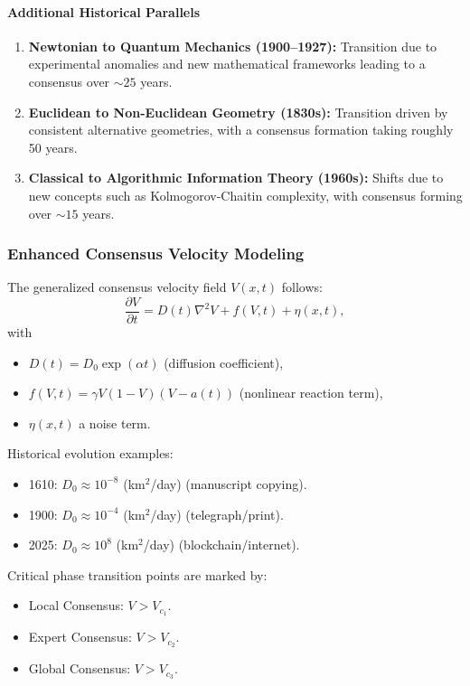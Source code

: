 \documentclass[11pt]{article}
\begin{document}
\paragraph{Additional Historical Parallels}
\begin{enumerate}[label=(\arabic*)]
    \item \textbf{Newtonian to Quantum Mechanics (1900--1927):} Transition due to experimental anomalies and new mathematical frameworks leading to a consensus over $\sim25$ years.
    \item \textbf{Euclidean to Non-Euclidean Geometry (1830s):} Transition driven by consistent alternative geometries, with a consensus formation taking roughly 50 years.
    \item \textbf{Classical to Algorithmic Information Theory (1960s):} Shifts due to new concepts such as Kolmogorov-Chaitin complexity, with consensus forming over $\sim15$ years.
\end{enumerate}

\subsubsection{Enhanced Consensus Velocity Modeling}

The generalized consensus velocity field $V(x,t)$ follows:
\[
\frac{\partial V}{\partial t} = D(t)\nabla^2 V + f(V,t) + \eta(x,t),
\]
with
\begin{itemize}
    \item $D(t)=D_0\exp(\alpha t)$ (diffusion coefficient),
    \item $f(V,t)=\gamma V (1-V)(V-a(t))$ (nonlinear reaction term),
    \item $\eta(x,t)$ a noise term.
\end{itemize}

Historical evolution examples:
\begin{itemize}
    \item 1610: $D_0\approx10^{-8}$ (km$^2$/day) (manuscript copying).
    \item 1900: $D_0\approx10^{-4}$ (km$^2$/day) (telegraph/print).
    \item 2025: $D_0\approx10^{8}$ (km$^2$/day) (blockchain/internet).
\end{itemize}

Critical phase transition points are marked by:
\begin{itemize}
    \item Local Consensus: $V > V_{c_1}$.
    \item Expert Consensus: $V > V_{c_2}$.
    \item Global Consensus: $V > V_{c_3}$.
\end{itemize}
\end{document}
